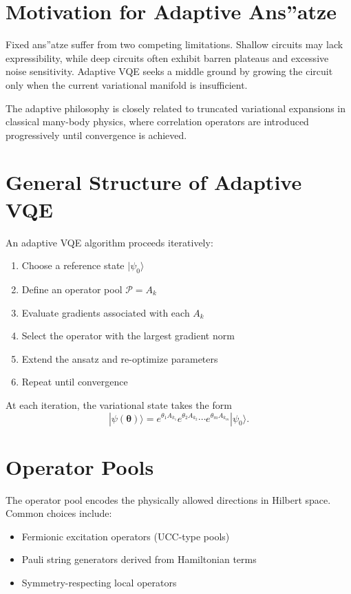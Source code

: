 \documentclass{book}
\begin{document}
\section{Motivation for Adaptive Ans”atze}

Fixed ans”atze suffer from two competing limitations. Shallow circuits may lack expressibility, while deep circuits often exhibit barren plateaus and excessive noise sensitivity. Adaptive VQE seeks a middle ground by growing the circuit only when the current variational manifold is insufficient.

The adaptive philosophy is closely related to truncated variational expansions in classical many-body physics, where correlation operators are introduced progressively until convergence is achieved.

\section{General Structure of Adaptive VQE}

An adaptive VQE algorithm proceeds iteratively:
\begin{enumerate}
\item Choose a reference state $|\psi_0\rangle$
\item Define an operator pool $\mathcal{P} = {A_k}$
\item Evaluate gradients associated with each $A_k$
\item Select the operator with the largest gradient norm
\item Extend the ansatz and re-optimize parameters
\item Repeat until convergence
\end{enumerate}

At each iteration, the variational state takes the form
\begin{equation}
|\psi(\bm\theta)\rangle = e^{\theta_1 A_{k_1}} e^{\theta_2 A_{k_2}} \cdots e^{\theta_m A_{k_m}} |\psi_0\rangle.
\end{equation}

\section{Operator Pools}

The operator pool encodes the physically allowed directions in Hilbert space. Common choices include:
\begin{itemize}
\item Fermionic excitation operators (UCC-type pools)
\item Pauli string generators derived from Hamiltonian terms
\item Symmetry-respecting local operators
\end{itemize}
\end{document}

